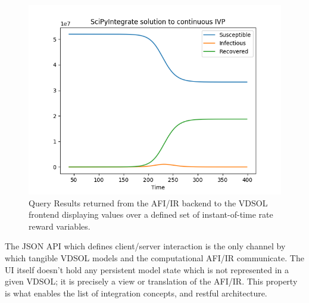 \documentclass[11pt]{article}
\begin{document}
\begin{figure}
\includegraphics[width=\textwidth]{figs/QueryResult.png}
\caption{Query Results returned from the AFI/IR backend to the VDSOL frontend displaying values over a defined set of instant-of-time rate reward variables.}
\label{Fig:QueryResult}
\end{figure}

The JSON API which defines client/server interaction is the only channel by which tangible VDSOL models and the computational AFI/IR communicate. The UI itself doesn't hold any persistent model state which is not represented in a given VDSOL; it is precisely a view or translation of the AFI/IR. This property is what enables the list of integration concepts, and restful architecture.


\end{document}
